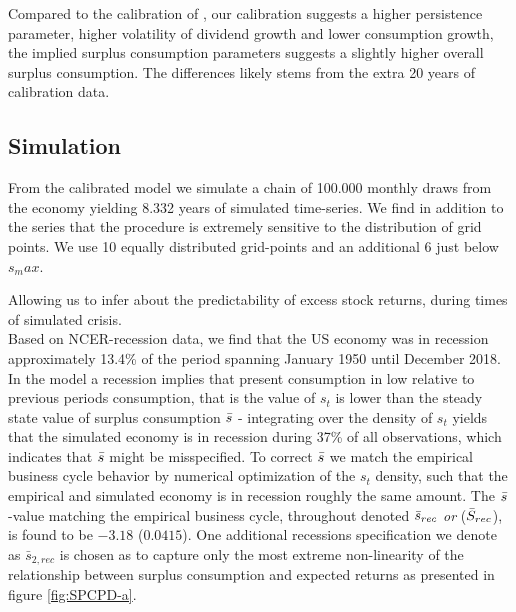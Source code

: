 Compared to the calibration of \citet{Campbell1999}, our calibration suggests a higher persistence parameter, higher volatility of dividend growth and lower consumption growth, the implied surplus consumption parameters suggests a slightly higher overall surplus consumption. The differences likely stems from the extra 20 years of calibration data. \\

\subsection{Simulation}
From the calibrated model we simulate a chain of 100.000 monthly draws from the economy yielding 8.332 years of simulated time-series. We find in addition to the series that the procedure is extremely sensitive to the distribution of grid points. We use 10 equally distributed grid-points and an additional 6 just below $s_max$.




Allowing us to infer about the predictability of excess stock returns, during times of simulated crisis. 
\newline
\\
Based on NCER-recession data, we find that the US economy was in recession approximately 13.4\% of the period spanning January 1950 until December 2018.  In the model a recession implies that present consumption in low relative to previous periods consumption, that is the value of $s_t$ is lower than the steady state value of surplus consumption $\Bar{s}$ - integrating over the density of $s_t$ yields that the simulated economy is in recession during 37\% of all observations, which indicates that $\Bar{s}$ might be misspecified. To correct $\Bar{s}$ we match the empirical business cycle behavior by numerical optimization of the $s_t$ density, such that the empirical and simulated economy is in recession roughly the same amount. The $\Bar{s}$-value matching the empirical business cycle, throughout denoted $\Bar{s}_{rec}$ \textit{or} ($\Bar{S}_{rec}$), is found to be $-3.18$ ($0.0415$). One additional recessions specification we denote as $\bar{s}_{2,rec}$ is chosen as to capture only the most extreme non-linearity of the relationship between surplus consumption and expected returns as presented in figure \ref{fig:SPCPD-a}.





